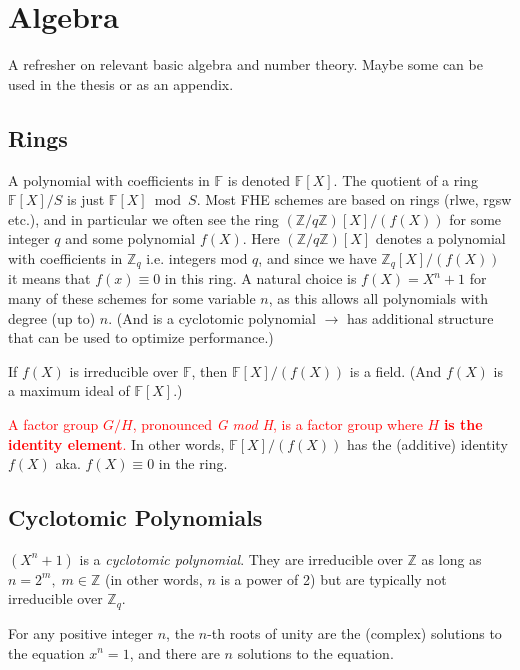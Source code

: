 \section{Algebra}
A refresher on relevant basic algebra and number theory. Maybe some can be used in the thesis or as an appendix.

\subsection{Rings}
A polynomial with coefficients in $\mathbb{F}$ is denoted $\mathbb{F}[X]$. The quotient of a ring $\mathbb{F}[X]/{S}$ is just $\mathbb{F}[X] \bmod{S}$. Most FHE schemes are based on rings (\gls{rlwe}, \gls{rgsw} etc.), and in particular we often see the ring $(\mathbb{Z}/q\mathbb{Z})[X] / (f(X))$ for some integer $q$ and some polynomial $f(X)$. Here $(\mathbb{Z}/q\mathbb{Z})[X]$ denotes a polynomial with coefficients in $\mathbb{Z}_q$ i.e. integers mod $q$, and since we have $\mathbb{Z}_q[X]/(f(X))$ it means that $f(x) \equiv 0$ in this ring. A natural choice is $f(X) = X^n + 1$ for many of these schemes for some variable $n$, as this allows all polynomials with degree (up to) $n$. (And is a cyclotomic polynomial $\to$ has additional structure that can be used to optimize performance.)

If $f(X)$ is irreducible over $\mathbb{F}$, then $\mathbb{F}[X]/(f(X))$ is a field. (And $f(X)$ is a maximum ideal of $\mathbb{F}[X]$.)

\textcolor{red}{A factor group $G/H$, pronounced \emph{G mod H}, is a factor group where $H$ \textbf{is the identity element}.} In other words, $\mathbb{F}[X]/(f(X))$ has the (additive) identity $f(X)$ aka. $f(X) \equiv 0$ in the ring.

\subsection{Cyclotomic Polynomials}
$(X^n + 1)$ is a \emph{cyclotomic polynomial}.
They are irreducible over $\mathbb{Z}$ as long as $n = 2^m,\; m\in\mathbb{Z}$ (in other words, $n$ is a power of 2) but are typically not irreducible over $\mathbb{Z}_q$.

\begin{definition}
    \label{def:roots-of-unity}
    For any positive integer $n$, the $n$-th roots of unity are the (complex) solutions to the equation $x^n = 1$, and there are $n$ solutions to the equation.
\end{definition}

